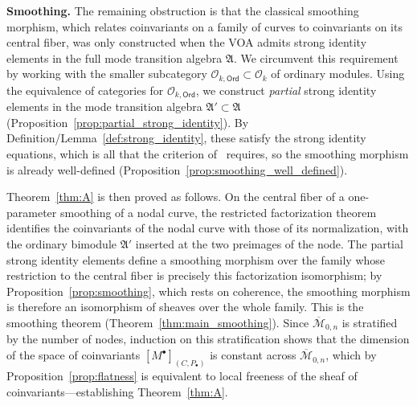 \documentclass[12pt,a4paper,reqno]{amsart}
\numberwithin{equation}{section}
\theoremstyle{definition}
\newcommand{\M}{\mathcal{M}}
\def\O{\mathcal{O}}
\def\Ord{\mathsf{Ord}}
\def\fA{\mathfrak{A}}
\begin{document}
\textbf{Smoothing.} The remaining obstruction is that the classical smoothing morphism, which relates coinvariants on a family of curves to coinvariants on its central fiber, was only constructed when the VOA admits strong identity elements in the full mode transition algebra $\fA$. We circumvent this requirement by working with the smaller subcategory $\O_{k,\Ord}\subset \O_k$ of ordinary modules. Using the equivalence of categories for $\O_{k,\Ord}$, we construct \emph{partial} strong identity elements in the mode transition algebra $\fA' \subset \fA$ (Proposition~\ref{prop:partial_strong_identity}). By Definition/Lemma~\ref{def:strong_identity}, these satisfy the strong identity equations, which is all that the criterion of~\cite[Proposition 5.1.2]{DGK2} requires, so the smoothing morphism is already well-defined (Proposition~\ref{prop:smoothing_well_defined}).

Theorem~\ref{thm:A} is then proved as follows. On the central fiber of a one-parameter smoothing of a nodal curve, the restricted factorization theorem identifies the coinvariants of the nodal curve with those of its normalization, with the ordinary bimodule $\fA'$ inserted at the two preimages of the node. The partial strong identity elements define a smoothing morphism over the family whose restriction to the central fiber is precisely this factorization isomorphism; by Proposition~\ref{prop:smoothing}, which rests on coherence, the smoothing morphism is therefore an isomorphism of sheaves over the whole family. This is the smoothing theorem (Theorem~\ref{thm:main_smoothing}). Since $\overline{\M}_{0,n}$ is stratified by the number of nodes, induction on this stratification shows that the dimension of the space of coinvariants $[M^\bullet]_{(C,P_\bullet)}$ is constant across $\overline{\M}_{0,n}$, which by Proposition~\ref{prop:flatness} is equivalent to local freeness of the sheaf of coinvariants---establishing Theorem~\ref{thm:A}.
\end{document}

